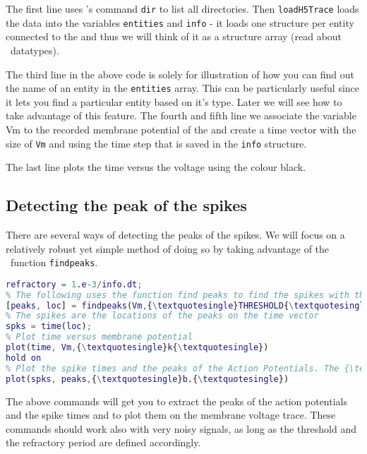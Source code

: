The first line uses \matlab 's command \texttt{dir} to list all directories. Then \texttt{loadH5Trace} loads the data into the variables \texttt{entities} and \texttt{info} -  it loads one structure per entity connected to the  and thus we will think of it as a structure array (read about \matlab\ datatypes).

The third line in the above code is solely for illustration of how you can find out the name of an entity in the \texttt{entities} array. This can be particularly useful since it lets you find a particular entity based on it's type. Later we will see how to take advantage of this feature.
The fourth and fifth line we associate the variable Vm to the recorded membrane potential of the  and create a time vector with the size of \texttt{Vm} and using the time step that is saved in the \texttt{info} structure.

The last line plots the time versus the voltage using the colour black.

\subsection{Detecting the peak of the spikes}

There are several ways of detecting the peaks of the spikes. We will focus on a relatively robust yet simple method of doing so by taking advantage of the \matlab\ function \texttt{findpeaks}.

\begin{lstlisting}[language=matlab,morekeywords={findpeaks,THRESHOLD,MINPEAKDISTANCE},escapeinside=\{\}]
% Define the refractory period of the peak detector (1ms); this can be useful when dealing with noisy signals.
refractory = 1.e-3/info.dt; 
% The following uses the function find peaks to find the spikes with threshold crossing at 0mV and a refractory period. 
[peaks, loc] = findpeaks(Vm,{\textquotesingle}THRESHOLD{\textquotesingle},0,{\textquotesingle}MINPEAKDISTANCE{\textquotesingle},refractory);
% The spikes are the locations of the peaks on the time vector
spks = time(loc);
% Plot time versus membrane potential
plot(time, Vm,{\textquotesingle}k{\textquotesingle})
hold on
% Plot the spike times and the peaks of the Action Potentials. The {\textquotesingle}hold on{\textquotesingle} command makes that the plots overlap.
plot(spks, peaks,{\textquotesingle}b.{\textquotesingle})
\end{lstlisting}

The above commands will get you to extract the peaks of the action potentials and the spike times and to plot them on the membrane voltage trace.
These commands should work also with very noisy signals, as long as the threshold and the refractory period are defined accordingly.
